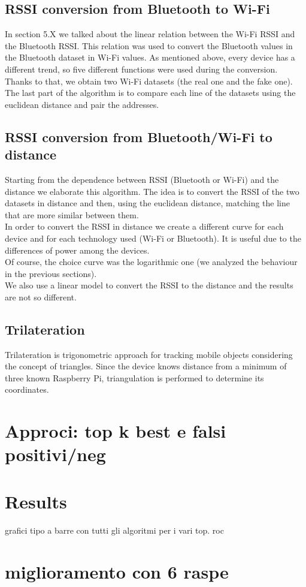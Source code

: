 \subsection{RSSI conversion from Bluetooth to Wi-Fi}
In section 5.X we talked about the linear relation between the Wi-Fi RSSI and the Bluetooth RSSI. This relation was used to convert the Bluetooth values in the Bluetooth dataset in Wi-Fi values. As mentioned above, every device has a different trend, so five different functions were used during the conversion.\\
Thanks to that, we obtain two Wi-Fi datasets (the real one and the fake one). The last part of the algorithm is to compare each line of the datasets using the euclidean distance and pair the addresses.

\subsection{RSSI conversion from Bluetooth/Wi-Fi to distance}
Starting from the dependence between RSSI (Bluetooth or Wi-Fi) and the distance we elaborate this algorithm. The idea is to convert the RSSI of the two datasets in distance and then, using the euclidean distance, matching the line that are more similar between them.\\
\linebreak
In order to convert the RSSI in distance we create a different curve for each device and for each technology used (Wi-Fi or Bluetooth). It is useful due to the differences of power among the devices.\\
\linebreak
Of course, the choice curve was the logarithmic one (we analyzed the behaviour in the previous sections).\\
We also use a linear model to convert the RSSI to the distance and the results are not so different.

\subsection{Trilateration}
Trilateration is trigonometric approach for tracking mobile objects considering the concept of triangles. Since the device knows distance from a minimum of three known Raspberry Pi, triangulation is performed to determine its coordinates. 

\section{Approci: top k best e falsi positivi/neg	}


\section{Results}
grafici tipo a barre con tutti gli algoritmi per i vari top.
roc

\section{miglioramento con 6 raspe}
